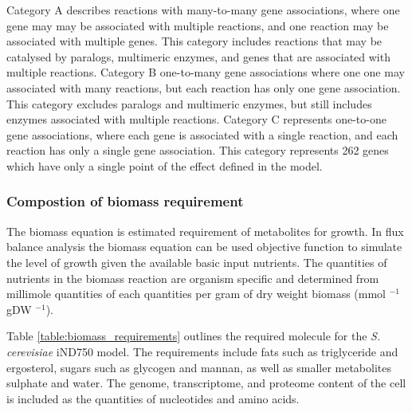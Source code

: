 Category A describes reactions with many-to-many gene associations, where one gene may may be associated with multiple reactions, and one reaction may be associated with multiple genes. This category includes reactions that may be catalysed by paralogs, multimeric enzymes, and genes that are associated with multiple reactions. Category B one-to-many gene associations where one one may associated with many reactions, but each reaction has only one gene association. This category excludes paralogs and multimeric enzymes, but still includes enzymes associated with multiple reactions. Category C represents one-to-one gene associations, where each gene is associated with a single reaction, and each reaction has only a single gene association. This category represents 262 genes which have only a single point of the effect defined in the model.

\subsubsection{Compostion of biomass requirement}

The biomass equation is estimated requirement of metabolites for growth. In flux balance analysis the biomass equation can be used objective function to simulate the level of growth given the available basic input nutrients. The quantities of nutrients in the biomass reaction are organism specific and determined from millimole quantities of each quantities per gram of dry weight biomass (mmol $^{-1}$ gDW $^{-1}$).

Table \vref{table:biomass_requirements} outlines the required molecule for the \emph{S. cerevisiae} iND750 model. The requirements include fats such as triglyceride and ergosterol, sugars such as glycogen and mannan, as well as smaller metabolites sulphate and water. The genome, transcriptome, and proteome content of the cell is included as the quantities of nucleotides and amino acids.

